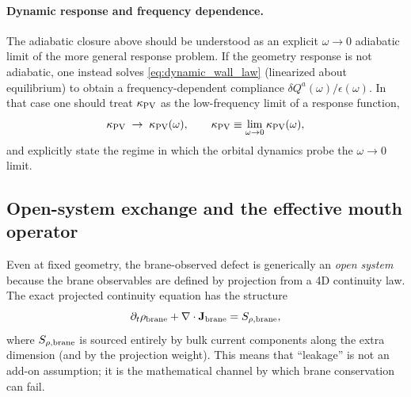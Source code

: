 \documentclass[11pt]{article}
\begin{document}
\paragraph{Dynamic response and frequency dependence.}
The adiabatic closure above should be understood as an explicit \(\omega\to0\) adiabatic limit of the more general response problem.
If the geometry response is not adiabatic, one instead solves \eqref{eq:dynamic_wall_law} (linearized
about equilibrium) to obtain a frequency-dependent compliance $\delta Q^a(\omega)/\epsilon(\omega)$.
In that case one should treat $\kappa_{\rm PV}$ as the low-frequency limit of a response function,
\begin{equation}
  \kappa_{\rm PV} \;\to\; \kappa_{\rm PV}(\omega),
  \qquad
  \kappa_{\rm PV}\equiv \lim_{\omega\to 0}\kappa_{\rm PV}(\omega),
\end{equation}
and explicitly state the regime in which the orbital dynamics probe the $\omega\to 0$ limit.

\subsection{Open-system exchange and the effective mouth operator}
\label{sec:undetermined:Zeff}

Even at fixed geometry, the brane-observed defect is generically an \emph{open system} because the brane
observables are defined by projection from a 4D continuity law. The exact projected continuity equation
has the structure
\begin{equation}
  \partial_t\rho_{\rm brane} + \nabla\cdot \mathbf J_{\rm brane} = S_{\rho,{\rm brane}},
  \label{eq:brane_cont_open}
\end{equation}
where $S_{\rho,{\rm brane}}$ is sourced entirely by bulk current components along the extra dimension
(and by the projection weight). This means that ``leakage'' is not an add-on assumption; it is the
mathematical channel by which brane conservation can fail.
\end{document}

